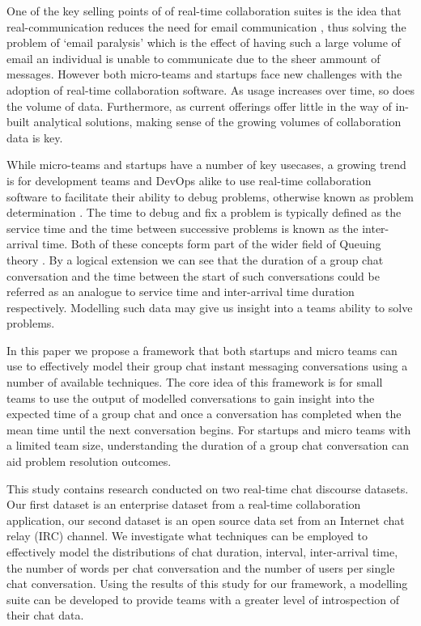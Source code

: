 \documentclass[conference]{IEEEtran}
\begin{document}
One of the key selling points of of real-time collaboration suites is the idea that real-communication reduces the need for email communication \cite{emailclutter}, thus solving the problem of `email paralysis' \cite{emailparal} which is the effect of having such a large volume of email an individual is unable to communicate due to the sheer ammount of messages. However both micro-teams and startups face new challenges with the adoption of real-time collaboration software. As usage increases over time, so does the volume of data. Furthermore, as current offerings offer little in the way of in-built analytical solutions, making sense of the growing volumes of collaboration data is key.  

While micro-teams and startups have a number of key usecases, a growing trend is for development teams and DevOps alike to use real-time collaboration software to facilitate their ability to debug problems, otherwise known as problem determination \cite{devslack} \cite{devopsslack}. The time to debug and fix a problem is typically defined as the service time and the time between successive problems is known as the inter-arrival time. Both of these concepts form part of the wider field of Queuing theory  \cite{kleinrock1975queuing}. By a logical extension we can see that the duration of a group chat conversation and the time between the start of such conversations could be referred as an analogue to service time and inter-arrival time duration respectively. Modelling such data may give us insight into a teams ability to solve problems. \par 

In this paper we propose a framework that both startups and micro teams can use to effectively model their group chat instant messaging conversations using a number of available techniques. The core idea of this framework is for small teams to use the output of modelled conversations to gain insight into the expected time of a group chat and once a conversation has completed when the mean time until the next conversation begins. For startups and micro teams with a limited team size, understanding the duration of a group chat conversation can aid problem resolution outcomes. \par

This study contains research conducted on two real-time chat discourse datasets. Our first dataset is an enterprise dataset from a real-time collaboration application, our second dataset is an open source data set from an Internet chat relay (IRC) channel. We investigate what techniques can be employed to effectively model the distributions of chat duration, interval, inter-arrival time, the number of words per chat conversation and the number of  users per single chat conversation. Using the results of this study for our framework, a modelling suite can be developed to provide teams with a greater level of introspection of their chat data. \par
\end{document}
